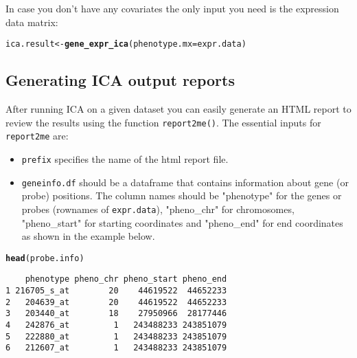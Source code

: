 \documentclass[11pt, oneside]{article}\usepackage[]{graphicx}\usepackage[]{color}
\makeatletter
\newcommand{\hlstd}[1]{\textcolor[rgb]{0.345,0.345,0.345}{#1}}%
\newcommand{\hlkwb}[1]{\textcolor[rgb]{0.69,0.353,0.396}{#1}}%
\newcommand{\hlkwc}[1]{\textcolor[rgb]{0.333,0.667,0.333}{#1}}%
\newcommand{\hlkwd}[1]{\textcolor[rgb]{0.737,0.353,0.396}{\textbf{#1}}}%
\newenvironment{kframe}{%
 \def\at@end@of@kframe{}%
 \ifinner\ifhmode%
  \def\at@end@of@kframe{\end{minipage}}%
  \begin{minipage}{\columnwidth}%
 \fi\fi%
 \def\FrameCommand##1{\hskip\@totalleftmargin \hskip-\fboxsep
 \colorbox{shadecolor}{##1}\hskip-\fboxsep
     \hskip-\linewidth \hskip-\@totalleftmargin \hskip\columnwidth}%
 \MakeFramed {\advance\hsize-\width
   \@totalleftmargin\z@ \linewidth\hsize
   \@setminipage}}%
 {\par\unskip\endMakeFramed%
 \at@end@of@kframe}
\newenvironment{knitrout}{}{} %
\makeatother
\begin{document}
In case you don't have any covariates the only input you need is the expression data matrix:

\begin{knitrout}
\color{fgcolor}\begin{kframe}
\begin{alltt}
\hlstd{ica.result} \hlkwb{<-} \hlkwd{gene_expr_ica}\hlstd{(}\hlkwc{phenotype.mx} \hlstd{= expr.data)}
\end{alltt}
\end{kframe}
\end{knitrout}

\subsection{Generating ICA output reports}

After running ICA on a given dataset you can easily generate an HTML report to review the results using the function \verb|report2me()|. The essential inputs for \verb|report2me| are:


\begin{itemize}

  \item \verb|prefix| specifies the name of the html report file.

  \item \verb|geneinfo.df| should be a dataframe that contains information about gene (or probe) positions. The column names should be "phenotype" for the genes or probes (rownames of \verb|expr.data|), "pheno\_chr" for chromosomes, "pheno\_start" for starting coordinates and "pheno\_end" for end coordinates as shown in the example below.

\end{itemize}

\begin{knitrout}
\color{fgcolor}\begin{kframe}
\begin{alltt}
\hlkwd{head}\hlstd{(probe.info)}
\end{alltt}
\begin{verbatim}
    phenotype pheno_chr pheno_start pheno_end
1 216705_s_at        20    44619522  44652233
2   204639_at        20    44619522  44652233
3   203440_at        18    27950966  28177446
4   242876_at         1   243488233 243851079
5   222880_at         1   243488233 243851079
6   212607_at         1   243488233 243851079
\end{verbatim}
\end{kframe}
\end{knitrout}
\end{document}
